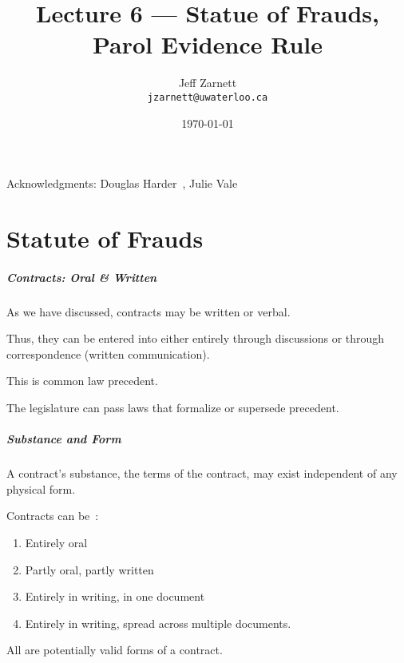 

\title{Lecture 6 --- Statue of Frauds, Parol Evidence Rule }

\author{Jeff Zarnett \\ \small \texttt{jzarnett@uwaterloo.ca}}
\date{\today}




\begin{frame}
  \titlepage

\begin{center}
  \small{Acknowledgments: Douglas Harder~\cite{dwh}, Julie Vale~\cite{jv}}
  \end{center}
\end{frame}

\part{Statute of Frauds}

\begin{frame}
\partpage
\end{frame}



\begin{frame}
\frametitle{Contracts: Oral \& Written}

As we have discussed, contracts may be written or verbal.

Thus, they can be entered into either entirely through discussions or through correspondence (written communication).

This is common law precedent.

The legislature can pass laws that formalize or supersede precedent.

\end{frame}



\begin{frame}
\frametitle{Substance and Form}

A contract's \alert{substance}, the terms of the contract, may exist independent of any physical \alert{form}.

Contracts can be~\cite{lba}:

\begin{enumerate}
	\item Entirely oral
	\item Partly oral, partly written
	\item Entirely in writing, in one document
	\item Entirely in writing, spread across multiple documents.
\end{enumerate}

All are potentially valid forms of a contract.

\end{frame}

